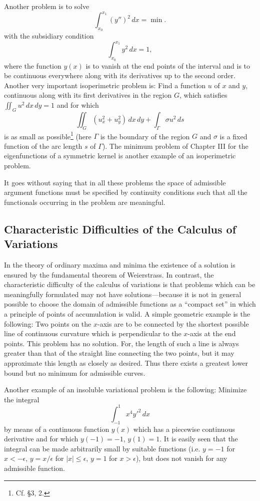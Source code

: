 Another problem is to solve
\[
\int_{x_0}^{x_1}(y'')^2\,dx=\min.
\]
with the subsidiary condition
\[
\int_{x_0}^{x_1}y^2\,dx=1,
\]
where the function $y(x)$ is to vanish at the end points of the interval and is to be continuous everywhere along with its derivatives up to the second order. Another very important isoperimetric problem is: Find a function $u$ of $x$ and $y$, continuous along with its first derivatives in the region $G$, which satisfies $\iint_Gu^2\,dx\,dy=1$ and for which
\begin{equation}\tag{4}
\iint_G(u_x^2+u_y^2)\,dx\,dy+\int_{\Gamma}\sigma u^2\,ds
\end{equation}
is as small as possible\footnote{Cf. \S3, 2.} (here $\Gamma$ is the boundary of the region $G$ and $\sigma$ is a fixed function of the arc length $s$ of $\Gamma$). The minimum problem of Chapter III for the eigenfunctions of a symmetric kernel is another example of an isoperimetric problem.

It goes without saying that in all these problems the space of admissible argument functions must be specified by continuity conditions such that all the functionals occurring in the problem are meaningful.

\subsection{Characteristic Difficulties of the Calculus of Variations}
In the theory of ordinary maxima and minima the existence of a solution is ensured by the fundamental theorem of Weierstrass. In contrast, the characteristic difficulty of the calculus of variations is that problems which can be meaningfully formulated may not have solutions---because it is not in general possible to choose the domain of admissible functions as a ``compact set'' in which a principle of points of accumulation is valid. A simple geometric example is the following: Two points on the $x$-axis are to be connected by the shortest possible line of continuous curvature which is perpendicular to the $x$-axis at the end points. This problem has no solution. For, the length of such a line is always greater than that of the straight line connecting the two points, but it may approximate this length as closely as desired. Thus there exists a greatest lower bound but no minimum for admissible curves.

Another example of an insoluble variational problem is the following: Minimize the integral
\begin{equation}\tag{5}
\int_{-1}^{1}x^4y'^2\,dx
\end{equation}
by means of a continuous function $y(x)$ which has a piecewise continuous derivative and for which $y(-1)=-1$, $y(1)=1$. It is easily seen that the integral can be made arbitrarily small by suitable functions (i.e. $y=-1$ for $x<-\epsilon$, $y=x/\epsilon$ for $|x|\le\epsilon$, $y=1$ for $x>\epsilon$), but does not vanish for any admissible function.

